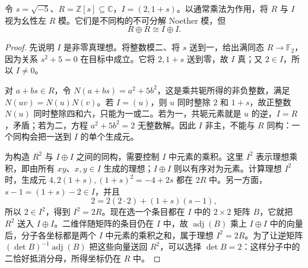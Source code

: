 \begin{example}\label{b2:ex:krull-schmidt-nonunique}
	令 \(s=\sqrt{-5}\)、\(R=\mathbb Z[s]\subseteq\mathbb C\)，\(I=(2,1+s)\)。以通常乘法为作用，将 \(R\) 与 \(I\) 视为幺性左 \(R\) 模。它们是不同构的不可分解 Noether 模，但
	\[
		R\oplus R\cong I\oplus I.
	\]
\end{example}
\begin{proof}
	先说明 \(I\) 是非零真理想。将整数模二、将 \(s\) 送到一，给出满同态 \(R\rightarrow\mathbb F_2\)，因为关系 \(s^2+5=0\) 在目标中成立。它将 \(2,1+s\) 送到零，故 \(I\) 真；又 \(2\in I\)，所以 \(I\ne0\)。

	对 \(a+bs\in R\)，令 \(N(a+bs)=a^2+5b^2\)，这是乘共轭所得的非负整数，满足 \(N(uv)=N(u)N(v)\)。若 \(I=(u)\)，则 \(u\) 同时整除 \(2\) 和 \(1+s\)，故正整数 \(N(u)\) 同时整除四和六，只能为一或二。若为一，共轭元素就是 \(u\) 的逆，\(I=R\)，矛盾；若为二，方程 \(a^2+5b^2=2\) 无整数解。因此 \(I\) 非主，不能与 \(R\) 同构：一个同构会把一送到 \(I\) 的单个生成元。

	为构造 \(R^2\) 与 \(I\oplus I\) 之间的同构，需要控制 \(I\) 中元素的乘积。这里 \(I^2\) 表示理想乘积，即由所有 \(xy\)、\(x,y\in I\) 生成的理想；\(I\oplus I\) 则以有序对为元素。计算理想 \(I^2\) 时，生成元 \(4,2(1+s),(1+s)^2=-4+2s\) 都在 \(2R\) 中。另一方面，\(s-1=(1+s)-2\in I\)，并且
	\[
		2=2(2\cdot2)+(1+s)(s-1),
	\]
	所以 \(2\in I^2\)，得到 \(I^2=2R\)。现在选一个条目都在 \(I\) 中的 \(2\times2\) 矩阵 \(B\)，它就把 \(R^2\) 送入 \(I\oplus I\)。二维伴随矩阵的条目仍在 \(I\) 中，故 \(\operatorname{adj}(B)\) 乘上 \(I\oplus I\) 中的向量后，分子各坐标都是两个 \(I\) 中元素的乘积之和，属于理想 \(I^2=2R\)。为了让逆矩阵 \((\det B)^{-1}\operatorname{adj}(B)\) 把这些向量送回 \(R^2\)，可以选择 \(\det B=2\)：这样分子中的二恰好抵消分母，所得坐标仍在 \(R\) 中。


\end{proof}
